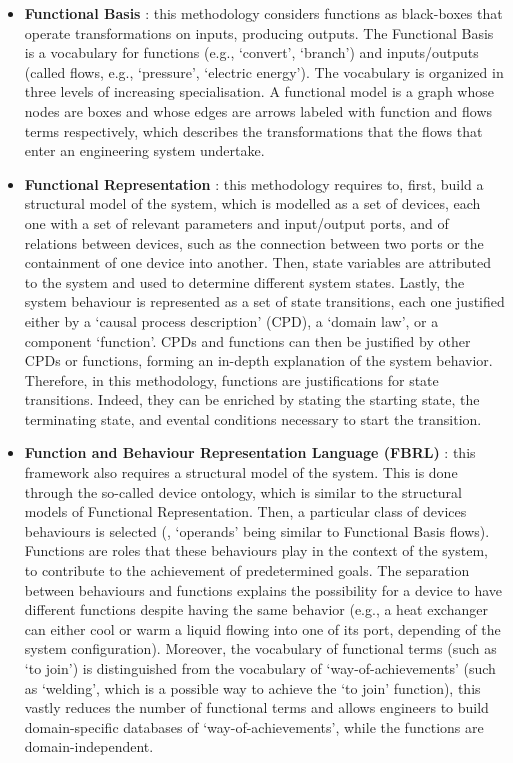\documentclass[
]{ceurart}
\begin{document}
\begin{itemize}
    \item \textbf{Functional Basis} \cite{hirtz_functional_2002,stone_development_2000}: this methodology considers functions as black-boxes that operate transformations on inputs, producing outputs. The Functional Basis is a vocabulary for functions (e.g., `convert', `branch') and inputs/outputs (called flows, e.g., `pressure', `electric energy'). The vocabulary is organized in three levels of increasing specialisation. A functional model is a graph whose nodes are boxes and whose edges are arrows labeled with function and flows terms respectively, which describes the transformations that the flows that enter an engineering system undertake.
    \item \textbf{Functional Representation} \cite{chandrasekaranFunctionalRepresentationDesign1993}: this methodology requires to, first, build a structural model of the system, which is modelled as a set of devices, each one with a set of relevant parameters and input/output ports, and of relations between devices, such as the connection between two ports or the containment of one device into another. Then, state variables are attributed to the system and used to determine different system states. Lastly, the system behaviour is represented as a set of state transitions, each one justified either by a `causal process description' (CPD), a `domain law', or a component `function'. CPDs and functions can then be justified by other CPDs or functions, forming an in-depth explanation of the system behavior. Therefore, in this methodology, functions are justifications for state transitions. Indeed, they can be enriched by stating the starting state, the terminating state, and evental conditions necessary to start the transition.
    \item \textbf{Function and Behaviour Representation Language (FBRL)} \cite{sasajimaFBRLFunctionBehavior1995, kitamuraOntologicalModelDevice2006}: this framework also requires a structural model of the system. This is done through the so-called device ontology, which is similar to the structural models of Functional Representation. Then, a particular class of devices behaviours is selected (, `operands' being similar to Functional Basis flows). Functions are roles that these behaviours play in the context of the system, to contribute to the achievement of predetermined goals. The separation between behaviours and functions explains the possibility for a device to have different functions despite having the same behavior (e.g., a heat exchanger can either cool or warm a liquid flowing into one of its port, depending of the system configuration). Moreover, the vocabulary of functional terms (such as `to join') is distinguished from the vocabulary of `way-of-achievements' (such as `welding', which is a possible way to achieve the `to join' function), this vastly reduces the number of functional terms and allows engineers to build domain-specific databases of `way-of-achievements', while the functions are domain-independent. 

\end{itemize}
\end{document}
